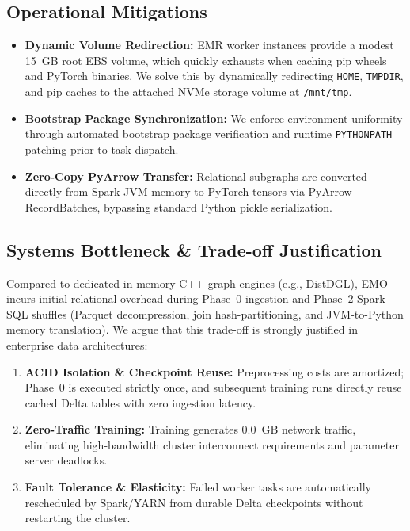 \documentclass[conference,compsoc]{IEEEtran}
\begin{document}
\subsection{Operational Mitigations}
\begin{itemize}
    \item \textbf{Dynamic Volume Redirection:} EMR worker instances provide a modest 15~GB root EBS volume, which quickly exhausts when caching pip wheels and PyTorch binaries. We solve this by dynamically redirecting \texttt{HOME}, \texttt{TMPDIR}, and pip caches to the attached NVMe storage volume at \texttt{/mnt/tmp}.
    \item \textbf{Bootstrap Package Synchronization:} We enforce environment uniformity through automated bootstrap package verification and runtime \texttt{PYTHONPATH} patching prior to task dispatch.
    \item \textbf{Zero-Copy PyArrow Transfer:} Relational subgraphs are converted directly from Spark JVM memory to PyTorch tensors via PyArrow RecordBatches, bypassing standard Python pickle serialization.
\end{itemize}

\subsection{Systems Bottleneck \& Trade-off Justification}
Compared to dedicated in-memory C++ graph engines (e.g., DistDGL), EMO incurs initial relational overhead during Phase~0 ingestion and Phase~2 Spark SQL shuffles (Parquet decompression, join hash-partitioning, and JVM-to-Python memory translation). We argue that this trade-off is strongly justified in enterprise data architectures:
\begin{enumerate}
    \item \textbf{ACID Isolation \& Checkpoint Reuse:} Preprocessing costs are amortized; Phase~0 is executed strictly once, and subsequent training runs directly reuse cached Delta tables with zero ingestion latency.
    \item \textbf{Zero-Traffic Training:} Training generates 0.0~GB network traffic, eliminating high-bandwidth cluster interconnect requirements and parameter server deadlocks.
    \item \textbf{Fault Tolerance \& Elasticity:} Failed worker tasks are automatically rescheduled by Spark/YARN from durable Delta checkpoints without restarting the cluster.
\end{enumerate}
\end{document}

